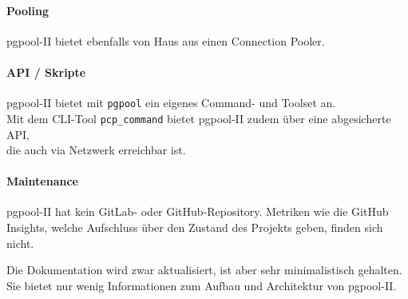 \begin{flushleft}
    \paragraph{Pooling}
    pgpool-II bietet ebenfalls von Haus aus einen \Gls{Connection Pooler}.
\end{flushleft}
\begin{flushleft}
    \paragraph{API / Skripte}
    pgpool-II bietet mit \texttt{pgpool} ein eigenes Command- und Toolset an.\\
    Mit dem CLI-Tool \texttt{pcp\_command} bietet pgpool-II zudem über eine abgesicherte API,\\
    die auch via Netzwerk erreichbar ist.
\end{flushleft}
\begin{flushleft}
    \paragraph{Maintenance}
    pgpool-II hat kein GitLab- oder GitHub-Repository.
    Metriken wie die GitHub Insights, welche Aufschluss über den Zustand des Projekts geben, finden sich nicht.
\end{flushleft}
\begin{flushleft}
    Die Dokumentation wird zwar aktualisiert, ist aber sehr minimalistisch gehalten.\\
    Sie bietet nur wenig Informationen zum Aufbau und Architektur von pgpool-II.
\end{flushleft}

